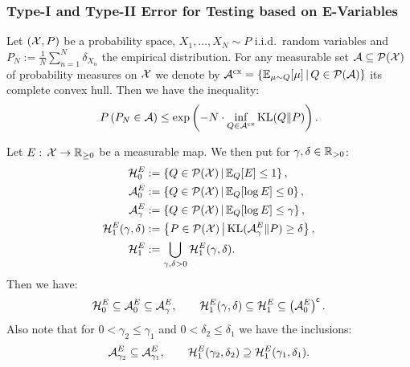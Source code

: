 \subsubsection{Type-I and Type-II Error for Testing based on E-Variables}


\begin{Thm}
    \label{sanov}
    Let $(\mathcal{X},P)$ be a probability space,  $X_1,\dots,X_N \sim P$ i.i.d.\ random variables and $P_N:=\frac{1}{N} \sum_{n=1}^N \delta_{X_n}$ the empirical distribution. 
    For any measurable set $\mathcal{A} \subseteq \mathcal{P}(\mathcal{X})$ of probability measures on $\mathcal{X}$ we denote by $\mathcal{A}^{\mathrm{cx}}=\{\mathbb{E}_{\mu \sim Q}[\mu]\,|\,Q \in \mathcal{P}(\mathcal{A}) \}$ its complete convex hull.
    Then we have the inequality:
    \[ P\left( P_N \in \mathcal{A} \right) \le \exp\left( -N \cdot \inf_{Q \in \mathcal{A}^{\mathrm{cx}}} \operatorname{\mathrm{KL}}(Q\|P) \right).   \]
\end{Thm}


\begin{Not}
    Let $E:\, \mathcal{X} \to \mathbb{R}_{\ge0}$ be a measurable map. We then put for $\gamma, \delta \in \mathbb{R}_{>0}$:
    \begin{align*}
        \mathcal{H}_0^E & := \left \{ Q \in \mathcal{P}(\mathcal{X}) \,\middle|\, \mathbb{E}_Q[E] \le 1 \right \},\\
        \mathcal{A}_0^E & := \left \{ Q \in \mathcal{P}(\mathcal{X}) \,\middle|\, \mathbb{E}_Q[\log E] \le 0 \right \},\\
        \mathcal{A}_\gamma^E & := \left \{ Q \in \mathcal{P}(\mathcal{X}) \,\middle|\, \mathbb{E}_Q[\log E] \le \gamma \right \},\\
        \mathcal{H}_{1}^E(\gamma,\delta) & := \left \{ P \in \mathcal{P}(\mathcal{X}) \,\middle|\, \operatorname{\mathrm{KL}}(\mathcal{A}_\gamma^E \|P) \ge \delta \right \},\\
        \mathcal{H}^E_1& := \bigcup_{\gamma,\delta >0} \mathcal{H}_{1}^E(\gamma,\delta).
    \end{align*}
    Then we have:
    \[  \mathcal{H}_0^E \subseteq \mathcal{A}_0^E \subseteq \mathcal{A}_\gamma^E, \qquad \mathcal{H}_{1}^E(\gamma,\delta) \subseteq \mathcal{H}_1^E \subseteq \left ( \mathcal{A}_0^E \right )^{\mathsf{c}}.  \]
    Also note that for $0<\gamma_2 \le \gamma_1$ and $0<\delta_2 \le \delta_1$ we have the inclusions:
    \[ \mathcal{A}_{\gamma_2}^E  \subseteq \mathcal{A}_{\gamma_1}^E, \qquad \mathcal{H}_{1}^E(\gamma_2,\delta_2)  \supseteq \mathcal{H}_{1}^E(\gamma_1,\delta_1).   \]
\end{Not}


